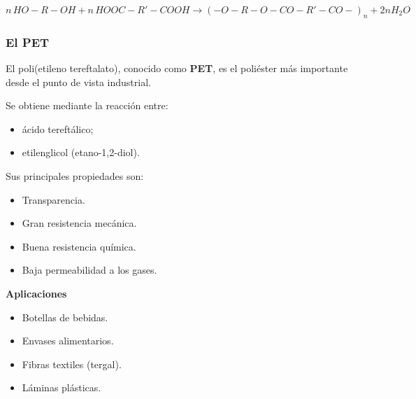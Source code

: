 \[
n\,HO-R-OH
+
n\,HOOC-R'-COOH
\longrightarrow
(-O-R-O-CO-R'-CO-)_n
+
2nH_2O
\]


\subsubsection*{El PET}

El poli(etileno tereftalato), conocido como \textbf{PET}, es el poliéster más
importante desde el punto de vista industrial.

Se obtiene mediante la reacción entre:

\begin{itemize}

\item ácido tereftálico;

\item etilenglicol (etano-1,2-diol).

\end{itemize}

Sus principales propiedades son:

\begin{itemize}

\item Transparencia.

\item Gran resistencia mecánica.

\item Buena resistencia química.

\item Baja permeabilidad a los gases.

\end{itemize}

\textbf{Aplicaciones}

\begin{itemize}

\item Botellas de bebidas.

\item Envases alimentarios.

\item Fibras textiles (tergal).

\item Láminas plásticas.

\end{itemize}


